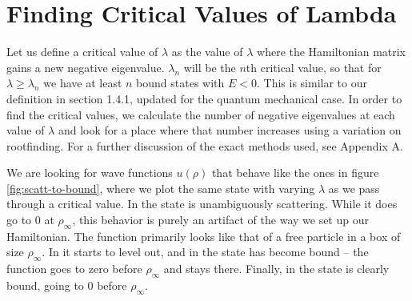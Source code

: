 \documentclass[12pt,twoside]{reedthesis}
\begin{document}
\section{Finding Critical Values of Lambda}
Let us define a critical value of $\lambda$ as the value of $\lambda$ where the Hamiltonian matrix gains a new negative eigenvalue. $\lambda_n$ will be the $n$th critical value, so that for $\lambda \geq \lambda_n$ we have at least $n$ bound states with $E < 0$. This is similar to our definition in section 1.4.1, updated for the quantum mechanical case.
In order to find the critical values, we calculate the number of negative eigenvalues at each value of $\lambda$ and look for a place where that number increases using a variation on rootfinding. For a further discussion of the exact methods used, see Appendix A.

We are looking for wave functions $u(\rho)$ that behave like the ones in figure \ref{fig:scatt-to-bound}, where we plot the same state with varying $\lambda$ as we pass through a critical value. In  the state is unambiguously scattering. While it does go to 0 at $\rho_{\infty}$, this behavior is purely an artifact of the way we set up our Hamiltonian.
The function primarily looks like that of a free particle in a box of size $\rho_{\infty}$. 
 In  it starts to level out, and in  the state has become bound -- the function goes to zero before $\rho_{\infty}$ and stays there. Finally, in  the state is clearly bound, going to 0 before $\rho_{\infty}$. 
\end{document}
